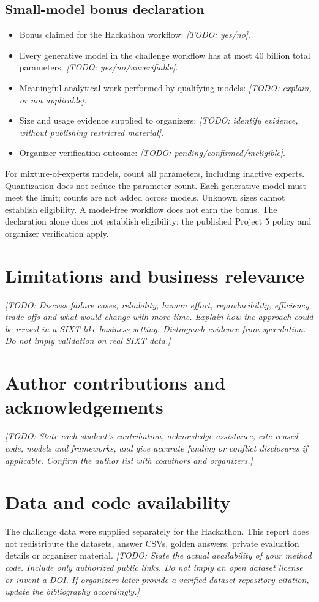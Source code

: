 \documentclass[11pt,a4paper]{article}
\newcommand{\todo}[1]{\textit{[TODO: #1]}}
\begin{document}
\subsection*{Small-model bonus declaration}
\begin{itemize}
  \item Bonus claimed for the Hackathon workflow: \todo{yes/no}.
  \item Every generative model in the challenge workflow has at most
    40 billion total parameters: \todo{yes/no/unverifiable}.
  \item Meaningful analytical work performed by qualifying models:
    \todo{explain, or not applicable}.
  \item Size and usage evidence supplied to organizers:
    \todo{identify evidence, without publishing restricted material}.
  \item Organizer verification outcome: \todo{pending/confirmed/ineligible}.
\end{itemize}
For mixture-of-experts models, count all parameters, including inactive
experts. Quantization does not reduce the parameter count. Each generative
model must meet the limit; counts are not added across models. Unknown sizes
cannot establish eligibility. A model-free workflow does not earn the bonus.
The declaration alone does not establish eligibility; the published Project 5
policy and organizer verification apply.

\section{Limitations and business relevance}
\todo{Discuss failure cases, reliability, human effort, reproducibility,
efficiency trade-offs and what would change with more time. Explain how the
approach could be reused in a SIXT-like business setting. Distinguish evidence
from speculation. Do not imply validation on real SIXT data.}

\section*{Author contributions and acknowledgements}
\todo{State each student's contribution, acknowledge assistance, cite reused
code, models and frameworks, and give accurate funding or conflict disclosures
if applicable. Confirm the author list with coauthors and organizers.}

\section*{Data and code availability}
The challenge data were supplied separately for the Hackathon. This report
does not redistribute the datasets, answer CSVs, golden answers, private
evaluation details or organizer material.
\todo{State the actual availability of your method code. Include only
authorized public links. Do not imply an open dataset license or invent a DOI.
If organizers later provide a verified dataset repository citation, update
the bibliography accordingly.}



\end{document}
